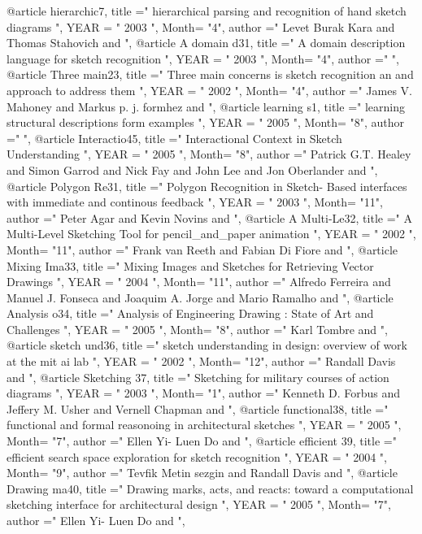 @article{ hierarchic7, 
  title ="  hierarchical parsing and recognition of hand sketch diagrams  ", 
 YEAR = " 2003  ",
Month= "4",
 author =" Levet Burak  Kara   and  Thomas Stahovich   and  ",
}
@article{ A domain d31, 
  title ="  A domain description language for sketch recognition  ", 
 YEAR = " 2003  ",
Month= "4",
 author =" ",
}
@article{ Three main23, 
  title ="  Three main concerns is sketch recognition an and approach to address them  ", 
 YEAR = " 2002  ",
Month= "4",
 author =" James V. Mahoney    and  Markus p. j. formhez   and  ",
}
@article{ learning s1, 
  title ="  learning structural descriptions form examples   ", 
 YEAR = " 2005  ",
Month= "8",
 author =" ",
}
@article{ Interactio45, 
  title ="  Interactional Context in Sketch Understanding  ", 
 YEAR = " 2005  ",
Month= "8",
 author =" Patrick G.T. Healey   and  Simon Garrod   and  Nick Fay   and  John Lee   and  Jon Oberlander   and  ",
}
@article{ Polygon Re31, 
  title ="  Polygon Recognition in Sketch- Based interfaces with immediate and continous feedback  ", 
 YEAR = " 2003  ",
Month= "11",
 author =" Peter Agar   and  Kevin Novins   and  ",
}
@article{ A Multi-Le32, 
  title ="  A Multi-Level Sketching Tool for pencil_and_paper animation   ", 
 YEAR = " 2002  ",
Month= "11",
 author =" Frank van Reeth   and  Fabian Di Fiore   and  ",
}
@article{ Mixing Ima33, 
  title ="  Mixing Images and Sketches for Retrieving Vector Drawings  ", 
 YEAR = " 2004  ",
Month= "11",
 author =" Alfredo Ferreira   and  Manuel J. Fonseca   and  Joaquim A. Jorge   and  Mario Ramalho   and  ",
}
@article{ Analysis o34, 
  title ="  Analysis of Engineering Drawing : State of Art and Challenges  ", 
 YEAR = " 2005  ",
Month= "8",
 author =" Karl Tombre   and  ",
}
@article{ sketch und36, 
  title ="  sketch understanding in design: overview of work at the mit ai lab  ", 
 YEAR = " 2002  ",
Month= "12",
 author =" Randall Davis   and  ",
}
@article{ Sketching 37, 
  title ="  Sketching for military courses of action diagrams  ", 
 YEAR = " 2003  ",
Month= "1",
 author =" Kenneth D. Forbus   and  Jeffery M.  Usher   and  Vernell Chapman   and  ",
}
@article{ functional38, 
  title ="  functional and formal reasonoing in architectural sketches  ", 
 YEAR = " 2005  ",
Month= "7",
 author =" Ellen Yi- Luen Do   and  ",
}
@article{ efficient 39, 
  title ="  efficient search space exploration for sketch recognition  ", 
 YEAR = " 2004  ",
Month= "9",
 author =" Tevfik Metin sezgin   and  Randall Davis   and  ",
}
@article{ Drawing ma40, 
  title ="  Drawing marks, acts, and reacts: toward a computational sketching interface for architectural design  ", 
 YEAR = " 2005  ",
Month= "7",
 author =" Ellen Yi- Luen Do   and  ",
}
